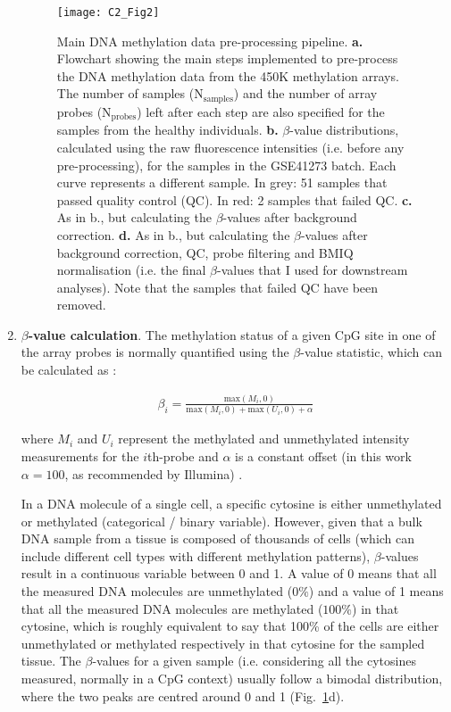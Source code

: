 \begin{enumerate}
	
	\begin{figure}[htbp!] 
		\centering    
		\texttt{[image: C2\_Fig2]}
		\vspace*{2mm}
		\caption[Main DNA methylation data pre-processing pipeline]{Main DNA methylation data pre-processing pipeline. \textbf{a.} Flowchart showing the main steps implemented to pre-process the DNA methylation data from the 450K methylation arrays. The number of samples (N$_{\text{samples}}$) and the number of array probes (N$_{\text{probes}}$) left after each step are also specified for the samples from the healthy individuals. \textbf{b.}  $\beta$-value distributions, calculated using the raw fluorescence intensities (i.e. before any pre-processing), for the samples in the GSE41273 batch. Each curve represents a different sample. In grey: 51 samples that passed quality control (QC). In red: 2 samples that failed QC.  \textbf{c.} As in b., but calculating the $\beta$-values after background correction. \textbf{d.} As in b., but calculating the $\beta$-values after background correction, QC, probe filtering and BMIQ normalisation (i.e. the final $\beta$-values that I used for downstream analyses). Note that the samples that failed QC have been removed.}
		\label{fig:c2_fig2}
	\end{figure}
	
	
	\item \textbf{$\beta$-value calculation}. The methylation status of a given CpG site in one of the array probes is normally quantified using the $\beta$-value statistic, which can be calculated as \citep{Wilhelm-Benartzi2013,Du2010}:
	
	\begin{align}
	\beta_i = \frac{\text{max}(M_i,0)}{\text{max}(M_i,0) + \text{max}(U_i,0) + \alpha}
	\end{align}
	
	where $M_i$ and $U_i$ represent the methylated and unmethylated intensity measurements for the $i$th-probe and $\alpha$ is a constant offset (in this work $\alpha = 100$, as recommended by Illumina) \citep{Du2010}. 
	
	In a DNA molecule of a single cell, a specific cytosine is either unmethylated or methylated (categorical / binary variable). However, given that a bulk DNA sample from a tissue is composed of thousands of cells (which can include different cell types with different methylation patterns), $\beta$-values result in a continuous variable between 0 and 1. A value of 0 means that all the measured DNA molecules are unmethylated ($0\%$) and a value of 1 means that all the measured DNA molecules are methylated ($100\%$) in that cytosine, which is roughly equivalent to say that 100\% of the cells are either unmethylated or methylated respectively in that cytosine for the sampled tissue. The $\beta$-values for a given sample (i.e. considering all the cytosines measured, normally in a CpG context) usually follow a bimodal distribution, where the two peaks are centred around 0 and 1 (Fig.~\ref{fig:c2_fig2}d). 
	

\end{enumerate}
